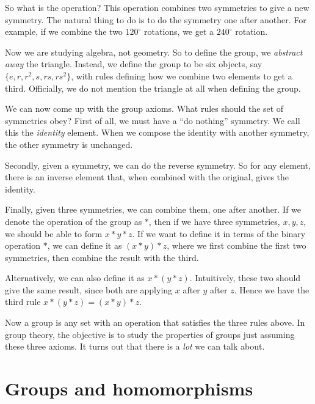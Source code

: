 \documentclass[a4paper]{article}
\begin{document}
So what is the operation? This operation combines two symmetries to give a new symmetry. The natural thing to do is to do the symmetry one after another. For example, if we combine the two $120^\circ$ rotations, we get a $240^\circ$ rotation.

Now we are studying algebra, not geometry. So to define the group, we \emph{abstract away} the triangle. Instead, we define the group to be six objects, say $\{e, r, r^2, s, rs, rs^2\}$, with rules defining how we combine two elements to get a third. Officially, we do not mention the triangle at all when defining the group.

We can now come up with the group axioms. What rules should the set of symmetries obey? First of all, we must have a ``do nothing'' symmetry. We call this the \emph{identity} element. When we compose the identity with another symmetry, the other symmetry is unchanged.

Secondly, given a symmetry, we can do the reverse symmetry. So for any element, there is an inverse element that, when combined with the original, gives the identity.

Finally, given three symmetries, we can combine them, one after another. If we denote the operation of the group as $*$, then if we have three symmetries, $x, y, z$, we should be able to form $x*y*z$. If we want to define it in terms of the binary operation $*$, we can define it as $(x*y)*z$, where we first combine the first two symmetries, then combine the result with the third.

Alternatively, we can also define it as $x*(y*z)$. Intuitively, these two should give the same result, since both are applying $x$ after $y$ after $z$. Hence we have the third rule $x*(y*z) = (x*y)*z$.

Now a group is any set with an operation that satisfies the three rules above. In group theory, the objective is to study the properties of groups just assuming these three axioms. It turns out that there is a \emph{lot} we can talk about.

\section{Groups and homomorphisms}
\end{document}
